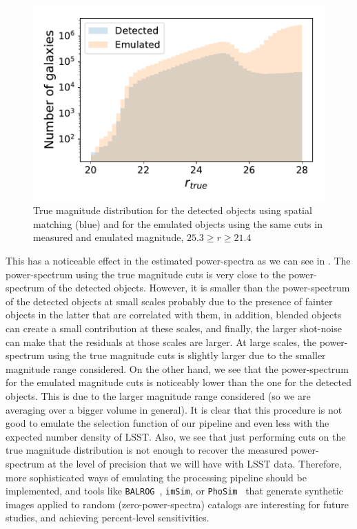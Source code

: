 \documentclass[\docopts]{\docclass}
\begin{document}
\begin{figure}
\centering
\includegraphics[width=0.9\columnwidth]{emulated_magnitude_histogram}
\caption{True magnitude distribution for the detected objects using spatial matching (blue) and for the emulated objects using the same cuts in measured and emulated magnitude, $25.3 \geq r \geq 21.4$}
\label{fig:emulated_magnitudes}
\end{figure}
This has a noticeable effect in the estimated power-spectra as we can see in . The power-spectrum using the true magnitude cuts is very close to the  power-spectrum of the detected objects. However, it is smaller than the power-spectrum of the detected objects at small scales probably due to the presence of fainter objects in the latter that are correlated with them, in addition, blended objects can create a small contribution at these scales, and finally, the larger shot-noise can make that the residuals at those scales are larger. At large scales, the power-spectrum using the true magnitude cuts is slightly larger due to the smaller magnitude range considered. On the other hand, we see that the power-spectrum for the emulated magnitude cuts is noticeably lower than the one for the detected objects. This is due to the larger magnitude range considered (so we are averaging over a bigger volume in general). It is clear that this procedure is not good to emulate the selection function of our pipeline and even less with the expected number density of LSST. Also, we see that just performing cuts on the true magnitude distribution is not enough to recover the measured power-spectrum at the level of precision that we will have with LSST data. Therefore, more sophisticated ways of emulating the processing pipeline should be implemented, and tools like \texttt{BALROG}~\citep{2016MNRAS.457..786S}, \texttt{imSim}, or \texttt{PhoSim}~\citep{2015ApJS..218...14P} that generate synthetic images applied to random (zero-power-spectra) catalogs are interesting for future studies, and achieving percent-level sensitivities.
\end{document}
